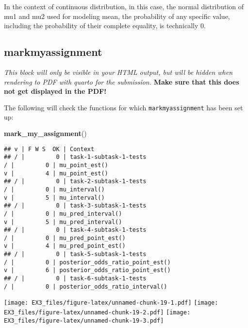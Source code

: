 \documentclass[
]{article}
\newenvironment{Shaded}{\begin{snugshade}}{\end{snugshade}}
\newcommand{\FunctionTok}[1]{\textcolor[rgb]{0.13,0.29,0.53}{\textbf{#1}}}
\newcommand{\NormalTok}[1]{#1}
\begin{document}
In the context of continuous distribution, in this case, the normal
distribution of mu1 and mu2 used for modeling mean, the probability of
any specific value, including the probability of their complete
equality, is technically 0.

\hypertarget{markmyassignment}{%
\subsection{markmyassignment}\label{markmyassignment}}

\emph{This block will only be visible in your HTML output, but will be
hidden when rendering to PDF with quarto for the submission.}
\textbf{Make sure that this does not get displayed in the PDF!}

The following will check the functions for which
\texttt{markmyassignment} has been set up:

\begin{Shaded}
\begin{Highlighting}[]
\FunctionTok{mark\_my\_assignment}\NormalTok{()    }
\end{Highlighting}
\end{Shaded}

\begin{verbatim}
## v | F W S  OK | Context
## / |         0 | task-1-subtask-1-tests                                          / |         0 | mu_point_est()                                                  v |         4 | mu_point_est()
## / |         0 | task-2-subtask-1-tests                                          / |         0 | mu_interval()                                                   v |         5 | mu_interval()
## / |         0 | task-3-subtask-1-tests                                          / |         0 | mu_pred_interval()                                              v |         5 | mu_pred_interval()
## / |         0 | task-4-subtask-1-tests                                          / |         0 | mu_pred_point_est()                                             v |         4 | mu_pred_point_est()
## / |         0 | task-5-subtask-1-tests                                          / |         0 | posterior_odds_ratio_point_est()                                v |         6 | posterior_odds_ratio_point_est()
## / |         0 | task-6-subtask-1-tests                                          / |         0 | posterior_odds_ratio_interval()
\end{verbatim}

\texttt{[image: EX3\_files/figure-latex/unnamed-chunk-19-1.pdf]}
\texttt{[image: EX3\_files/figure-latex/unnamed-chunk-19-2.pdf]}
\texttt{[image: EX3\_files/figure-latex/unnamed-chunk-19-3.pdf]}
\end{document}
